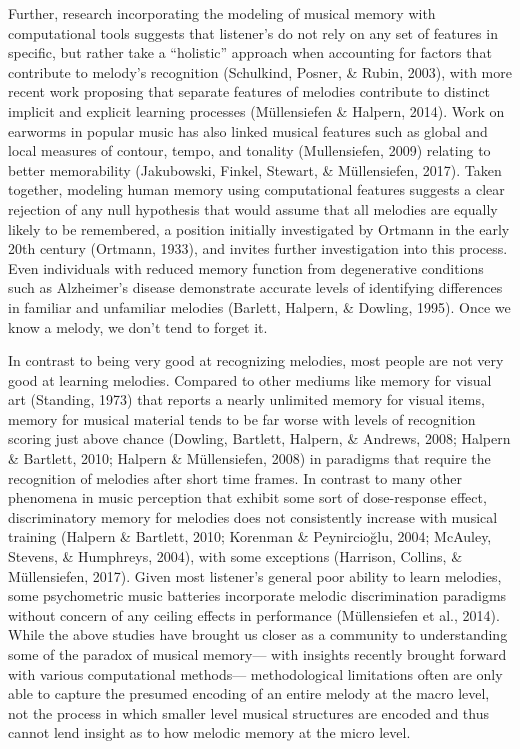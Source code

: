 \documentclass[english,man]{apa6}
\begin{document}
Further, research incorporating the modeling of musical memory with computational tools suggests that listener's do not rely on any set of features in specific, but rather take a \enquote{holistic} approach when accounting for factors that contribute to melody's recognition (Schulkind, Posner, \& Rubin, 2003), with more recent work proposing that separate features of melodies contribute to distinct implicit and explicit learning processes (Müllensiefen \& Halpern, 2014).
Work on earworms in popular music has also linked musical features such as global and local measures of contour, tempo, and tonality (Mullensiefen, 2009) relating to better memorability (Jakubowski, Finkel, Stewart, \& Müllensiefen, 2017).
Taken together, modeling human memory using computational features suggests a clear rejection of any null hypothesis that would assume that all melodies are equally likely to be remembered, a position initially investigated by Ortmann in the early 20th century (Ortmann, 1933), and invites further investigation into this process.\\
Even individuals with reduced memory function from degenerative conditions such as Alzheimer's disease demonstrate accurate levels of identifying differences in familiar and unfamiliar melodies (Barlett, Halpern, \& Dowling, 1995).
Once we know a melody, we don't tend to forget it.

In contrast to being very good at recognizing melodies, most people are not very good at learning melodies.
Compared to other mediums like memory for visual art (Standing, 1973) that reports a nearly unlimited memory for visual items, memory for musical material tends to be far worse with levels of recognition scoring just above chance (Dowling, Bartlett, Halpern, \& Andrews, 2008; Halpern \& Bartlett, 2010; Halpern \& Müllensiefen, 2008) in paradigms that require the recognition of melodies after short time frames.
In contrast to many other phenomena in music perception that exhibit some sort of dose-response effect, discriminatory memory for melodies does not consistently increase with musical training (Halpern \& Bartlett, 2010; Korenman \& Peynircioğlu, 2004; McAuley, Stevens, \& Humphreys, 2004), with some exceptions (Harrison, Collins, \& Müllensiefen, 2017).
Given most listener's general poor ability to learn melodies, some psychometric music batteries incorporate melodic discrimination paradigms without concern of any ceiling effects in performance (Müllensiefen et al., 2014).
While the above studies have brought us closer as a community to understanding some of the paradox of musical memory--- with insights recently brought forward with various computational methods--- methodological limitations often are only able to capture the presumed encoding of an entire melody at the macro level, not the process in which smaller level musical structures are encoded and thus cannot lend insight as to how melodic memory at the micro level.
\end{document}
